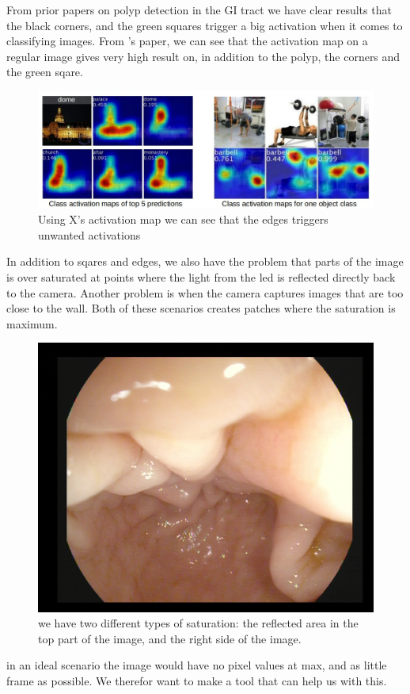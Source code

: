   From prior papers on polyp detection in the GI tract %
  we have clear results that the black corners, and the green squares trigger a big activation %
  when it comes to classifying images. 
  From %
  's paper, we can see that the activation map on a regular image gives very high result on, in addition to the polyp, the corners and the green sqare. 
  \begin{figure}[ht]
    \centering
    \includegraphics[scale=0.5]{background/figures/placeholder.jpeg}
    \caption{Using X's activation map we can see that the edges triggers unwanted activations}
  \end{figure}
  
  In addition to sqares and edges, we also have the problem that parts of the image is over saturated at points where the light from the led is reflected directly back to the camera.
  Another problem is when the camera captures images that are too close to the wall. Both of these scenarios creates patches where the saturation is maximum. 
   \begin{figure}[ht]
    \centering
    \includegraphics[scale=0.5]{background/figures/reflection.jpg}
    \caption{we have two different types of saturation: the reflected area in the top part of the image, and the right side of the image.}
  \end{figure}
  in an ideal scenario the image would have no pixel values at max, and as little frame as possible. 
  We therefor want to make a tool that can help us with this.

